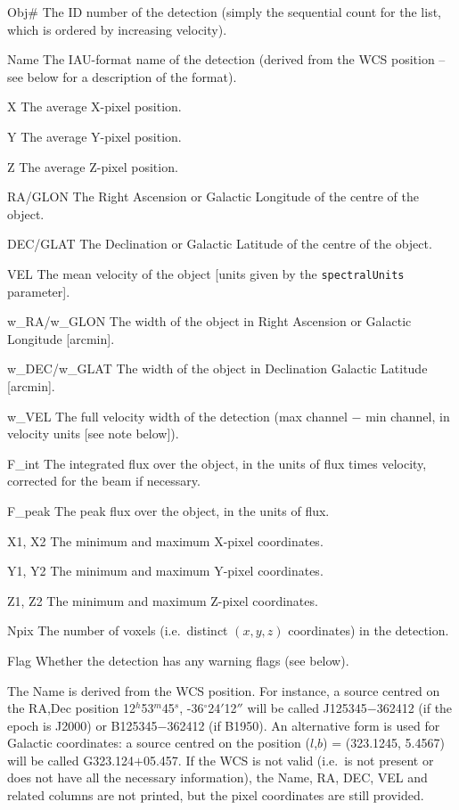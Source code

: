 \documentclass[12pt,a4paper]{article}
\newcommand{\ie}{i.e.\ }
\newcommand{\entrylabel}[1]{\mbox{\textsf{\bf{#1:}}}\hfil}
\newenvironment{entry}
        {\begin{list}{}%
                {\renewcommand{\makelabel}{\entrylabel}%
                        \setlength{\labelwidth}{30mm}%
                        \setlength{\labelsep}{5pt}%
                        \setlength{\itemsep}{2pt}%
                        \setlength{\parsep}{2pt}%
                        \setlength{\leftmargin}{35mm}%
                }%
        }%
{\end{list}}
\begin{document}
\begin{entry}
\item[Obj\#] The ID number of the detection (simply the sequential
  count for the list, which is ordered by increasing velocity).
\item[Name] The IAU-format name of the detection (derived from the WCS
  position -- see below for a description of the format).
\item[X] The average X-pixel position.
\item[Y] The average Y-pixel position.
\item[Z] The average Z-pixel position.
\item[RA/GLON] The Right Ascension or Galactic Longitude of the centre
of the object.
\item[DEC/GLAT] The Declination or Galactic Latitude of the centre of
the object.
\item[VEL] The mean velocity of the object [units given by the
  \texttt{spectralUnits} parameter].
\item[w\_RA/w\_GLON] The width of the object in Right Ascension or
Galactic Longitude [arcmin].
\item[w\_DEC/w\_GLAT] The width of the object in Declination Galactic
  Latitude [arcmin].
\item[w\_VEL] The full velocity width of the detection (max channel
  $-$ min channel, in velocity units [see note below]).
\item[F\_int] The integrated flux over the object, in the units of
  flux times velocity, corrected for the beam if necessary.
\item[F\_peak] The peak flux over the object, in the units of flux.
\item[X1, X2] The minimum and maximum X-pixel coordinates.
\item[Y1, Y2] The minimum and maximum Y-pixel coordinates.
\item[Z1, Z2] The minimum and maximum Z-pixel coordinates.
\item[Npix] The number of voxels (\ie distinct $(x,y,z)$ coordinates)
  in the detection.
\item[Flag] Whether the detection has any warning flags (see below). 
\end{entry}
The Name is derived from the WCS position. For instance, a source
centred on the RA,Dec position 12$^h$53$^m$45$^s$,
-36$^\circ$24$'$12$''$ will be called J125345$-$362412 (if the epoch
is J2000) or B125345$-$362412 (if B1950). An alternative form is used
for Galactic coordinates: a source centred on the position ($l$,$b$) =
(323.1245, 5.4567) will be called G323.124$+$05.457. If the WCS is not
valid (\ie is not present or does not have all the necessary
information), the Name, RA, DEC, VEL and related columns are not
printed, but the pixel coordinates are still provided.
\end{document}
